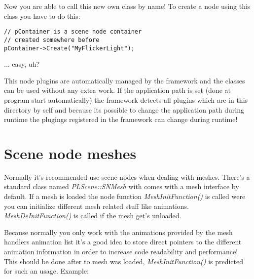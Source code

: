 Now you are able to call this new own class by name! To create a node using this class you have to do this:

\begin{lstlisting}[caption=Creating an instance of an own scene node class]
// pContainer is a scene node container
// created somewhere before
pContainer->Create("MyFlickerLight");
\end{lstlisting}

... easy, uh?

This node plugins are automatically managed by the framework and the classes can be used without any extra work. If the application path is set (done at program start automatically) the framework detects all plugins which are in this directory by self and because its possible to change the application path during runtime the plugings registered in the framework can change during runtime!




\section{Scene node meshes}
Normally it's recommended use scene nodes when dealing with meshes. There's a standard class named \emph{PLScene::SNMesh} with comes with a mesh interface by default. If a mesh is loaded the node function \emph{MeshInitFunction()} is called were you can initialize different mesh related stuff like animations. \emph{MeshDeInitFunction()} is called if the mesh get's unloaded.

Because normally you only work with the animations provided by the mesh handlers animation list it's a good idea to store direct pointers to the different animation information in order to increase code readability and performance! This should be done after to mesh was loaded, \emph{MeshInitFunction()} is predicted for such an usage. Example:

